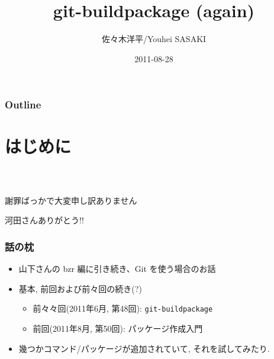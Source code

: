 \documentclass[10pt,final,c,dvipdfmx,cjk,colorlinks=false]{beamer}
\title{git-buildpackage (again)}
\author{佐々木洋平/Youhei SASAKI}
\date{\footnotesize{2011-08-28}}
\renewcommand{\maketitle}{\settitleslide\begin{frame}\titlepage\end{frame}\setdefaultslide}
\begin{document}
\maketitle

\begin{frame}
\frametitle{Outline}
\setcounter{tocdepth}{3}
\tableofcontents
\end{frame}

\section{はじめに}
\label{sec-1}
\begin{frame}
\frametitle{　}
\label{sec-1-1}

\end{frame}
\begin{frame}{謝罪ばっかで大変申し訳ありません}
\begin{center}
{\huge{河田さんありがとう!!}}
\end{center}
\end{frame}
\begin{frame}
\frametitle{話の枕}
\label{sec-1-2}


\begin{itemize}
\item 山下さんの bzr 編に引き続き、Git を使う場合のお話
\item 基本, 前回および前々回の続き(?)
\begin{itemize}
\item 前々々回(2011年6月, 第48回): \texttt{git-buildpackage}
\item 前回(2011年8月, 第50回): パッケージ作成入門
\end{itemize}
\item 幾つかコマンド/パッケージが追加されていて, それを試してみたり.
\end{itemize}
\end{frame}
\end{document}
